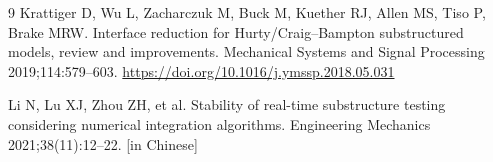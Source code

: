 \documentclass[11pt,a4paper]{article}
\numberwithin{equation}{section}
\begin{document}
\begin{thebibliography}{9}
	Krattiger D, Wu L, Zacharczuk M, Buck M, Kuether RJ, Allen MS, Tiso P, Brake MRW. Interface reduction for Hurty/Craig--Bampton substructured models, review and improvements. Mechanical Systems and Signal Processing 2019;114:579--603. \url{https://doi.org/10.1016/j.ymssp.2018.05.031}
	
	Li N, Lu XJ, Zhou ZH, et al. Stability of real-time substructure testing considering numerical integration algorithms. Engineering Mechanics 2021;38(11):12--22. [in Chinese]
	
\end{thebibliography}
\end{document}
